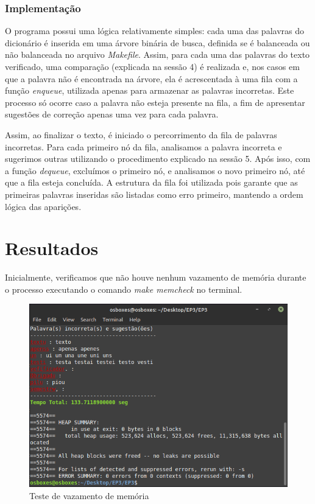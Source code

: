 \documentclass[12pt]{article}
\begin{document}
	\section{Implementação}
	
	O programa possui uma lógica relativamente simples: cada uma das palavras do dicionário é inserida em uma árvore binária de busca, definida se é balanceada ou não balanceada no arquivo \textit{Makefile}. Assim, para cada uma das palavras do texto verificado, uma comparação (explicada na sessão 4) é realizada e, nos casos em que a palavra não é encontrada na árvore, ela é acrescentada à uma fila com a função \textit{enqueue}, utilizada apenas para armazenar as palavras incorretas. Este processo só ocorre caso a palavra não esteja presente na fila, a fim de apresentar sugestões de correção apenas uma vez para cada palavra.
	
	Assim, ao finalizar o texto, é iniciado o percorrimento da fila de palavras incorretas. Para cada primeiro nó da fila, analisamos a palavra incorreta e sugerimos outras utilizando o procedimento explicado na sessão 5. Após isso, com a função \textit{dequeue}, excluímos o primeiro nó, e analisamos o novo primeiro nó, até que a fila esteja concluída. A estrutura da fila foi utilizada pois garante que as primeiras palavras inseridas são listadas como erro primeiro, mantendo a ordem lógica das aparições.
	
	\part{Resultados}
	\hrulefill
	
	Inicialmente, verificamos que não houve nenhum vazamento de memória durante o processo executando o comando \textit{make memcheck} no terminal.
	
	\begin{center}
		\begin{figure}[!h]
			\includegraphics[scale = 0.9]{vazamento.png}
			\caption{Teste de vazamento de memória}
		\end{figure}
	\end{center}
	
\end{document}
